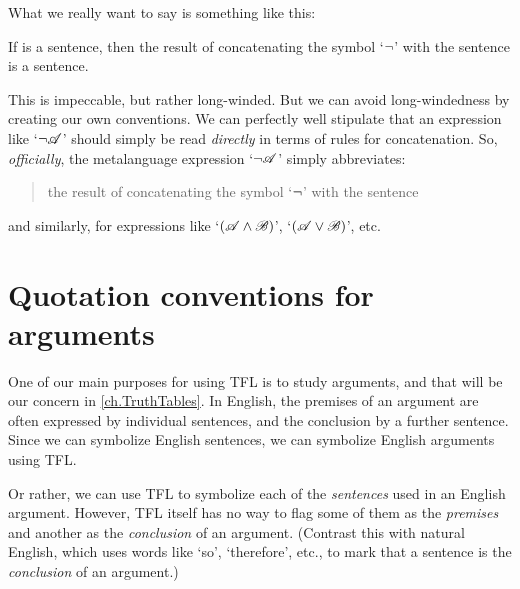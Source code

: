 What we really want to say is something like this:
	\begin{numberlist}
		\item[2$'''$.] If  is a sentence, then the result of concatenating the symbol `$\neg$' with the sentence  is a sentence.
	\end{numberlist}
This is impeccable, but rather long-winded. %
But we can avoid long-windedness by creating our own conventions. We can perfectly well stipulate that an expression like `$\neg \mathscr{A}$' should simply be read \emph{directly} in terms of rules for concatenation. So, \emph{officially}, the metalanguage expression `$\neg \mathscr{A}$'
simply abbreviates:
\begin{quote}
	the result of concatenating the symbol `$\neg$' with the sentence 
\end{quote}
and similarly, for expressions like `$(\mathscr{A} \wedge \mathscr{B})$', `$(\mathscr{A} \vee \mathscr{B})$', etc.


\section{Quotation conventions for arguments}
One of our main purposes for using TFL is to study arguments, and that will be our concern in \cref{ch.TruthTables}. In English, the premises of an argument are often expressed by individual sentences, and the conclusion by a further sentence. Since we can symbolize English sentences, we can symbolize English arguments using TFL.

Or rather, we can use TFL to symbolize each of the \emph{sentences} used in an English argument. However, TFL itself has no way to flag some of them as the \emph{premises} and another as the \emph{conclusion} of an argument.  (Contrast this with natural English, which uses words like `so', `therefore', etc., to mark that a sentence is the \emph{conclusion} of an argument.)

